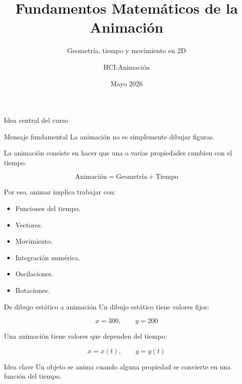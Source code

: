 \documentclass{beamer}
\title{Fundamentos Matemáticos de la Animación}
\subtitle{Geometría, tiempo y movimiento en 2D}
\author{HCI:Animación}
\date{Mayo 2026}
\begin{document}
\begin{frame}
\titlepage
\end{frame}

\begin{frame}{Idea central del curso}
\begin{block}{Mensaje fundamental}
La animación no es simplemente dibujar figuras.
\end{block}

\medskip

La animación consiste en hacer que una o varias propiedades cambien con el tiempo.

\[
\text{Animación} = \text{Geometría} + \text{Tiempo}
\]

\medskip

Por eso, animar implica trabajar con:

\begin{itemize}
    \item Funciones del tiempo.
    \item Vectores.
    \item Movimiento.
    \item Integración numérica.
    \item Oscilaciones.
    \item Rotaciones.
\end{itemize}
\end{frame}

\begin{frame}{De dibujo estático a animación}
Un dibujo estático tiene valores fijos:

\[
x = 300,\qquad y = 200
\]

\medskip

Una animación tiene valores que dependen del tiempo:

\[
x = x(t),\qquad y = y(t)
\]

\medskip

\begin{block}{Idea clave}
Un objeto se anima cuando alguna propiedad se convierte en una función del tiempo.
\end{block}
\end{frame}
\end{document}
